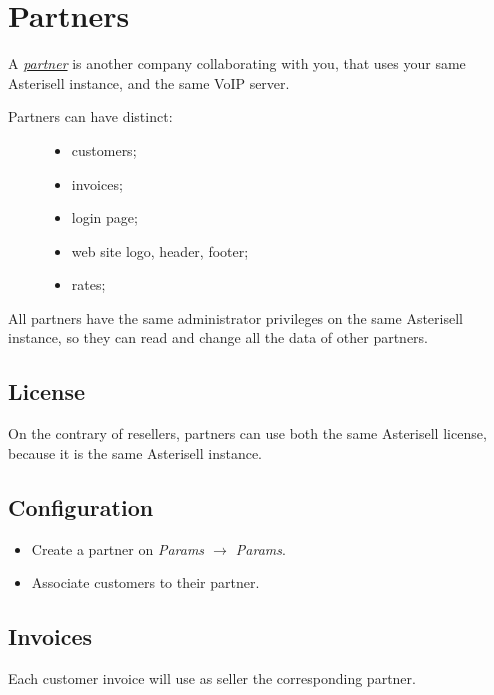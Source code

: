 \documentclass[letterpaper,10pt,english]{sphinxmanual}
\begin{document}
\section{Partners}
\label{index:partners}\label{index:id5}
A {\hyperref[index:term-partner]{\emph{partner}}} is another company collaborating with you, that uses your same Asterisell instance, and the same VoIP server.
\begin{description}
\item[{Partners can have distinct:}] \leavevmode\begin{itemize}
\item {} 
customers;

\item {} 
invoices;

\item {} 
login page;

\item {} 
web site logo, header, footer;

\item {} 
rates;

\end{itemize}

\end{description}

All partners have the same administrator privileges on the same Asterisell instance, so they can read and change all the data of other partners.


\subsection{License}
\label{index:id6}
On the contrary of resellers, partners can use both the same Asterisell license, because it is the same Asterisell instance.


\subsection{Configuration}
\label{index:configuration}\begin{itemize}
\item {} 
Create a partner on \emph{Params \(\rightarrow\) Params}.

\item {} 
Associate customers to their partner.

\end{itemize}


\subsection{Invoices}
\label{index:id7}
Each customer invoice will use as seller the corresponding partner.
\end{document}
